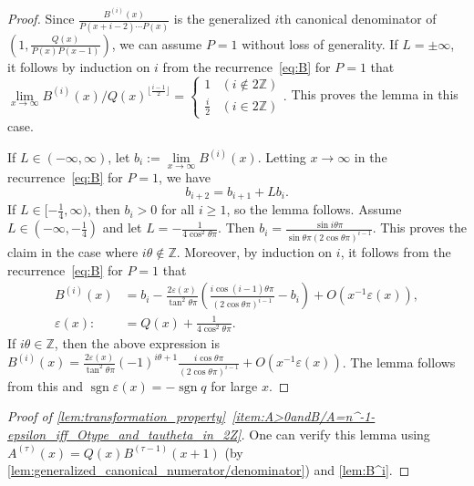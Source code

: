 \documentclass[a4paper,UKenglish,cleveref,autoref,thm-restate]{lipics-v2021}
\newcommand{\Z}{\mathbb{Z}}
\DeclareMathOperator{\sgn}{sgn}
\begin{document}
\begin{proof}
Since $\frac{B^{(i)}(x)}{P(x+i-2) \dotsm P(x)}$ is the generalized $i$th canonical denominator of $\left( 1, \frac{Q(x)}{P(x)P(x-1)} \right)$, we can assume $P=1$ without loss of generality. If $L = \pm \infty$, it follows by induction on $i$ from the recurrence~\eqref{eq:B} for $P=1$ that
$
\lim\limits_{x \to \infty} B^{(i)}(x) / Q (x)^{\lfloor \frac{i-1}2 \rfloor} = 
\begin{cases}
1 & (i \not\in 2 \Z) \\
\frac{i}2 & (i \in 2 \Z)
\end{cases}.
$
This proves the lemma in this case. 

If $L \in (-\infty, \infty)$, let $b_i := \lim\limits_{x \to \infty} B^{(i)}(x)$. Letting $x \to \infty$ in the recurrence~\eqref{eq:B} for $P=1$, we have
\begin{equation} \label{eq:b=b+Lb}
b_{i+2} = b_{i+1} + L b_i.
\end{equation}
If $L \in [-\frac14, \infty)$, then $b_i > 0$ for all $i \geq 1$, so the lemma follows. Assume $L \in (-\infty, -\frac14)$ and let $L = -\frac1{4 \cos^2 \theta \pi}$. Then $b_i = \frac{ \sin i \theta \pi}{\sin \theta \pi (2 \cos \theta \pi)^{i-1}}$. This proves the claim in the case where $i \theta \not\in \Z$. Moreover, by induction on $i$, it follows from the recurrence~\eqref{eq:B} for $P=1$ that
\[ \label{eq:B^i=sin_i*theta*pi}
\begin{aligned}
B^{(i)} (x) 
&= 
b_i
-
\frac{2\varepsilon(x)}{\tan^2 \theta \pi}
\left( 
\frac{i \cos (i-1) \theta \pi}{(2 \cos \theta \pi)^{i-1} }
-
b_i
\right)
+
O\left( x^{-1} \varepsilon(x) \right),
\\
\varepsilon(x) :&= Q(x) + \frac1{4\cos^2 \theta \pi}.
\end{aligned}
\]
If $i \theta \in \Z$, then the above expression is $B^{(i)}(x) = \frac{2\varepsilon(x)}{\tan^2 \theta \pi} (-1)^{i \theta + 1} \frac{i \cos \theta \pi}{(2 \cos \theta \pi)^{i-1} } + O\left( x^{-1} \varepsilon(x) \right)$. The lemma follows from this and $\sgn \varepsilon (x) = - \sgn q$ for large $x$. 
\end{proof}

\begin{proof}[Proof of \cref{lem:transformation_property}~\eqref{item:A>0andB/A=n^-1-epsilon_iff_Otype_and_tautheta_in_2Z}]
One can verify this lemma using $A^{(\tau)}(x) = Q(x)B^{(\tau-1)}(x+1)$ (by \cref{lem:generalized_canonical_numerator/denominator}) and \cref{lem:B^i}. 
\end{proof}
\end{document}
